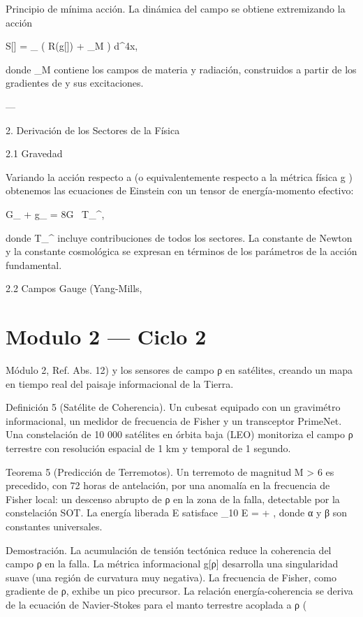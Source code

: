 \documentclass[12pt,twoside]{book}
\begin{document}
Principio de mínima acción. La dinámica del campo  \rho  se obtiene extremizando la acción

S[\rho] = \int_{}  \left( R(g[\rho]) + _M \right) d^4x,

donde  _M  contiene los campos de materia y radiación, construidos a partir de los gradientes de  \rho  y sus excitaciones.

---

2. Derivación de los Sectores de la Física

2.1 Gravedad

Variando la acción respecto a  \rho  (o equivalentemente respecto a la métrica física  g ) obtenemos las ecuaciones de Einstein con un tensor de energía-momento efectivo:

G_{\mu\nu} + \Lambda g_{\mu\nu} = 8\pi G \, T_{\mu\nu}^{},

donde  T_{\mu\nu}^{}  incluye contribuciones de todos los sectores. La constante de Newton y la constante cosmológica se expresan en términos de los parámetros de la acción fundamental.

2.2 Campos Gauge (Yang-Mills, 

\chapter{Modulo 2 — Ciclo 2}
Módulo 2, Ref. Abs. 12) y los sensores de campo ρ en satélites, creando un mapa en tiempo real del paisaje informacional de la Tierra.

Definición 5 (Satélite de Coherencia). Un cubesat equipado con un gravimétro informacional, un medidor de frecuencia de Fisher y un transceptor PrimeNet. Una constelación de 10 000 satélites en órbita baja (LEO) monitoriza el campo ρ terrestre con resolución espacial de 1 km y temporal de 1 segundo.

Teorema 5 (Predicción de Terremotos). Un terremoto de magnitud M > 6 es precedido, con 72 horas de antelación, por una anomalía en la frecuencia de Fisher local: un descenso abrupto de ρ en la zona de la falla, detectable por la constelación SOT. La energía liberada E satisface  \log_{10} E = \alpha + \beta \Delta \rho , donde α y β son constantes universales.

Demostración. La acumulación de tensión tectónica reduce la coherencia del campo ρ en la falla. La métrica informacional g[ρ] desarrolla una singularidad suave (una región de curvatura muy negativa). La frecuencia de Fisher, como gradiente de ρ, exhibe un pico precursor. La relación energía‑coherencia se deriva de la ecuación de Navier‑Stokes para el manto terrestre acoplada a ρ (
\end{document}
